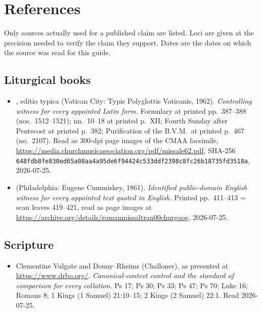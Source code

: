 \section{References}

Only sources actually used for a published claim are listed. Loci are given at
the precision needed to verify the claim they support. Dates are the dates on
which the source was read for this guide.

\subsection*{Liturgical books}

\begin{itemize}[leftmargin=1.3em, itemsep=0.25em]
\item {}, editio typica (Vatican City:
Typis Polyglottis Vaticanis, 1962). \emph{Controlling witness for every
appointed Latin form.} Formulary at printed pp.\ 387--388 (nos.\ 1512--1521);
 nn.\ 10--18 at printed p.\ XII; Fourth Sunday after
Pentecost at printed p.\ 382; Purification of the B.V.M.\ at printed p.\ 467
(no.\ 2107). Read as 300-dpi page images of the CMAA facsimile,
\url{https://media.churchmusicassociation.org/pdf/missale62.pdf}, SHA-256
\texttt{648fdb8fe830ed65a08aa4a95de6f94424c533ddf2398c8fc26b18735fd3518a},
2026-07-25.
\item {} (Philadelphia: Eugene Cummiskey, 1861). \emph{Identified
public-domain English witness for every appointed text quoted in English.}
Printed pp.\ 411--413 = scan leaves 419--421, read as page images at
\url{https://archive.org/details/romanmissaltran00churgoog}, 2026-07-25.
\end{itemize}

\subsection*{Scripture}

\begin{itemize}[leftmargin=1.3em, itemsep=0.25em]
\item Clementine Vulgate and Douay--Rheims (Challoner), as presented at
\url{https://www.drbo.org/}. \emph{Canonical-context control and the standard
of comparison for every collation.} Ps 17; Ps 30; Ps 33; Ps 47; Ps 70; Luke 16;
Romans 8; 1 Kings (1 Samuel) 21:10--15; 2 Kings (2 Samuel) 22:1. Read
2026-07-25.
\end{itemize}

